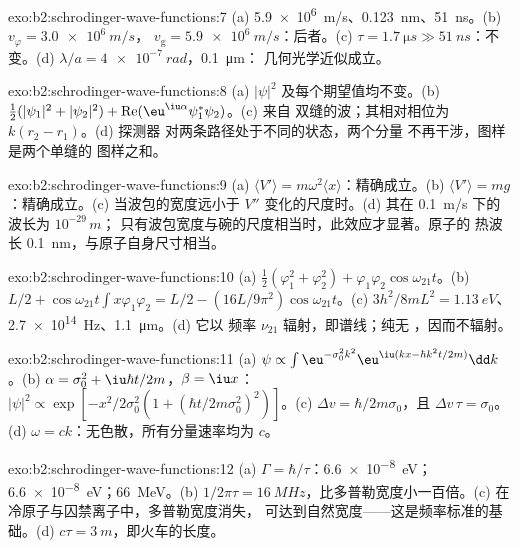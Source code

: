 \begin{solution}{exo:b2:schrodinger-wave-functions:7}
(a) \qty{5.9e6}{m/s}、\qty{0.123}{nm}、\qty{51}{ns}。(b) $v_\varphi = \qty{3.0e6}{m/s}$，
$v_{\text{g}} = \qty{5.9e6}{m/s}$：后者。(c) $\tau = \qty{1.7}{\micro s} \gg
\qty{51}{ns}$：不变。(d) $\lambda/a = \qty{4e-7}{rad}$，\qty{0.1}{\micro m}：
几何光学近似成立。
\end{solution}

\begin{solution}{exo:b2:schrodinger-wave-functions:8}
(a) $|\psi|^2$ 及每个期望值均不变。(b) $\tfrac12(|\psi_1|^2
+ |\psi_2|^2) + \operatorname{Re}(\eu^{\iu\alpha}\psi_1^*\psi_2)$。(c) 来自
双缝的波；其相对相位为 $k(r_2 - r_1)$。(d) 探测器
对两条路径处于不同的状态，两个分量
不再干涉，图样是两个单缝的
图样之和。
\end{solution}

\begin{solution}{exo:b2:schrodinger-wave-functions:9}
(a) $\langle V'\rangle = m\omega^2\langle x\rangle$：精确成立。(b) $\langle V'\rangle
= mg$：精确成立。(c) 当波包的宽度远小于
$V''$ 变化的尺度时。(d) 其在 \qty{0.1}{m/s} 下的波长为 $10^{-29}\,\unit{m}$；
只有波包宽度与碗的尺度相当时，此效应才显著。原子的
热波长 \qty{0.1}{nm}，与原子自身尺寸相当。
\end{solution}

\begin{solution}{exo:b2:schrodinger-wave-functions:10}
(a) $\tfrac12(\varphi_1^2 + \varphi_2^2) + \varphi_1\varphi_2\cos\omega_{21}t$。(b) $L/2 +
\cos\omega_{21}t\int x\varphi_1\varphi_2 = L/2 - (16L/9\pi^2)\cos\omega_{21}t$。(c)
$3h^2/8mL^2 = \qty{1.13}{eV}$、\qty{2.7e14}{Hz}、\qty{1.1}{\micro m}。(d) 它以
频率 $\nu_{21}$ 辐射，即谱线；纯无
，因而不辐射。
\end{solution}

\begin{solution}{exo:b2:schrodinger-wave-functions:11}
(a) $\psi \propto \int\eu^{-\sigma_0^2k^2}\eu^{\iu(kx - \hbar k^2t/2m)}\dd k$。(b) $\alpha =
\sigma_0^2 + \iu\hbar t/2m$，$\beta = \iu x$：$|\psi|^2 \propto \exp[-x^2/2\sigma_0^2(1 +
(\hbar t/2m\sigma_0^2)^2)]$。(c) $\Delta v = \hbar/2m\sigma_0$，且 $\Delta v\,\tau =
\sigma_0$。(d) $\omega = ck$：无色散，所有分量速率均为 $c$。
\end{solution}

\begin{solution}{exo:b2:schrodinger-wave-functions:12}
(a) $\Gamma = \hbar/\tau$：\qty{6.6e-8}{eV}；\qty{6.6e-8}{eV}；\qty{66}{MeV}。(b)
$1/2\pi\tau = \qty{16}{MHz}$，比多普勒宽度小一百倍。(c) 在
冷原子与囚禁离子中，多普勒宽度消失，
可达到自然宽度——这是频率标准的基础。(d) $c\tau =
\qty{3}{m}$，即火车的长度。
\end{solution}

